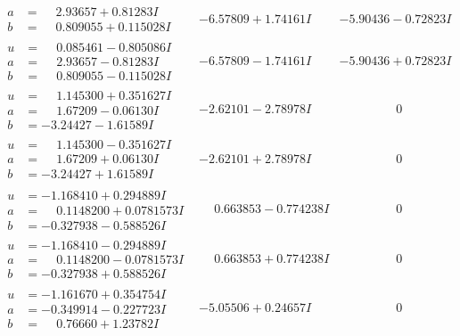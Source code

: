 \documentclass[1p]{elsarticle_modified}
\theoremstyle{definition}
\begin{document}
$$\begin{array}{c|c|c}
\begin{aligned}
a &= \phantom{-}2.93657 + 0.81283 I \\
b &= \phantom{-}0.809055 + 0.115028 I\end{aligned}
 & -6.57809 + 1.74161 I & -5.90436 - 0.72823 I \\ \hline\begin{aligned}
u &= \phantom{-}0.085461 - 0.805086 I \\
a &= \phantom{-}2.93657 - 0.81283 I \\
b &= \phantom{-}0.809055 - 0.115028 I\end{aligned}
 & -6.57809 - 1.74161 I & -5.90436 + 0.72823 I \\ \hline\begin{aligned}
u &= \phantom{-}1.145300 + 0.351627 I \\
a &= \phantom{-}1.67209 - 0.06130 I \\
b &= -3.24427 - 1.61589 I\end{aligned}
 & -2.62101 - 2.78978 I & \phantom{-0.000000 } 0 \\ \hline\begin{aligned}
u &= \phantom{-}1.145300 - 0.351627 I \\
a &= \phantom{-}1.67209 + 0.06130 I \\
b &= -3.24427 + 1.61589 I\end{aligned}
 & -2.62101 + 2.78978 I & \phantom{-0.000000 } 0 \\ \hline\begin{aligned}
u &= -1.168410 + 0.294889 I \\
a &= \phantom{-}0.1148200 + 0.0781573 I \\
b &= -0.327938 - 0.588526 I\end{aligned}
 & \phantom{-}0.663853 - 0.774238 I & \phantom{-0.000000 } 0 \\ \hline\begin{aligned}
u &= -1.168410 - 0.294889 I \\
a &= \phantom{-}0.1148200 - 0.0781573 I \\
b &= -0.327938 + 0.588526 I\end{aligned}
 & \phantom{-}0.663853 + 0.774238 I & \phantom{-0.000000 } 0 \\ \hline\begin{aligned}
u &= -1.161670 + 0.354754 I \\
a &= -0.349914 - 0.227723 I \\
b &= \phantom{-}0.76660 + 1.23782 I\end{aligned}
 & -5.05506 + 0.24657 I & \phantom{-0.000000 } 0 \\ \hline\begin{aligned}

\end{aligned}
\end{array}$$
\end{document}
